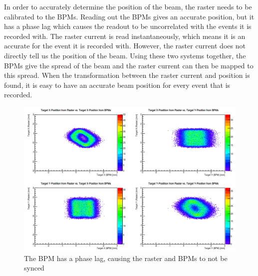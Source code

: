 In order to accurately determine the position of the beam, the raster needs to be calibrated to the BPMs. Reading out the BPMs gives an accurate position, but it has a phase lag which causes the readout to be uncorrelated with the events it is recorded with. The raster current is read instantaneously, which means it is an accurate for the event it is recorded with. However, the raster current does not directly tell us the position of the beam. Using these two systems together, the BPMs give the spread of the beam and the raster current can then be mapped to this spread. When the transformation between the raster current and position is found, it is easy to have an accurate beam position for every event that is recorded.

\begin{figure}
	\includegraphics[width=\linewidth]{./chap3-analysis/fig/raster_bpm_sync.png}
	\caption{The BPM has a phase lag, causing the raster and BPMs to not be synced}
	\label{fig:raster}
\end{figure}